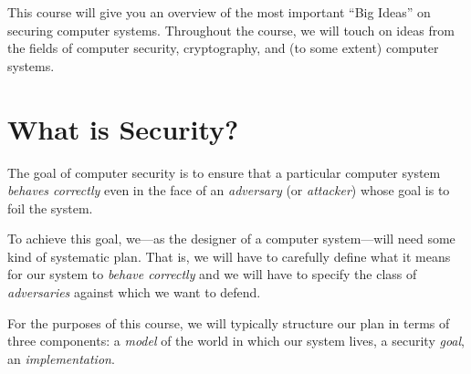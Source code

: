 \documentclass[
  letterpaper,
]{scrbook}
\theoremstyle{definition}
\theoremstyle{plain}
\theoremstyle{plain}
\theoremstyle{remark}
\begin{document}
This course will give you an overview of the most important ``Big
Ideas'' on securing computer systems. Throughout the course, we will
touch on ideas from the fields of computer security, cryptography, and
(to some extent) computer systems.

\section{What is Security?}\label{what-is-security-1}

The goal of computer security is to ensure that a particular computer
system \emph{behaves correctly} even in the face of an \emph{adversary}
(or \emph{attacker}) whose goal is to foil the system.


To achieve this goal, we---as the designer of a computer system---will
need some kind of systematic plan. That is, we will have to carefully
define what it means for our system to \emph{behave correctly} and we
will have to specify the class of \emph{adversaries} against which we
want to defend.

For the purposes of this course, we will typically structure our plan in
terms of three components: a \emph{model} of the world in which our
system lives, a security \emph{goal}, an \emph{implementation}.
\end{document}
